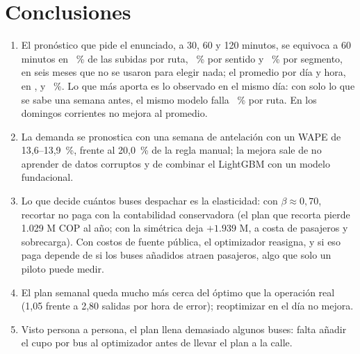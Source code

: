 \section{Conclusiones}
\label{sec:conclusiones}

\begin{enumerate}
  \item El pronóstico que pide el enunciado, a 30, 60 y 120 minutos, se equivoca a 60 minutos en \CPRutaModLX~\% de
        las subidas por ruta, \CPSentModLX~\% por sentido y \CPSegModLX~\% por segmento, en seis meses que no se
        usaron para elegir nada; el promedio por día y hora, en \CPRutaPromLX, \CPSentPromLX{} y \CPSegPromLX~\%. Lo que
        más aporta es lo observado en el mismo día: con solo lo que se sabe una semana antes, el mismo modelo falla
        \CPSemanalLX~\% por ruta. En los domingos corrientes no mejora al promedio.
  \item La demanda se pronostica con una semana de antelación con un WAPE de 13,6--13,9~\%, frente al 20,0~\% de la regla
        manual; la mejora sale de no aprender de datos corruptos y de combinar el LightGBM con un modelo fundacional.
  \item Lo que decide cuántos buses despachar es la elasticidad: con $\beta \approx 0{,}70$, recortar no paga con la
        contabilidad conservadora (el plan que recorta pierde 1.029 M COP al año; con la simétrica deja $+1.939$ M, a costa
        de pasajeros y sobrecarga). Con costos de fuente pública, el optimizador reasigna, y si eso paga depende
        de si los buses añadidos atraen pasajeros, algo que solo un piloto puede medir.
  \item El plan semanal queda mucho más cerca del óptimo que la operación real (1,05 frente a 2,80 salidas por hora de
        error); reoptimizar en el día no mejora.
  \item Visto persona a persona, el plan llena demasiado algunos buses: falta añadir el cupo por bus al optimizador antes
        de llevar el plan a la calle.
\end{enumerate}
